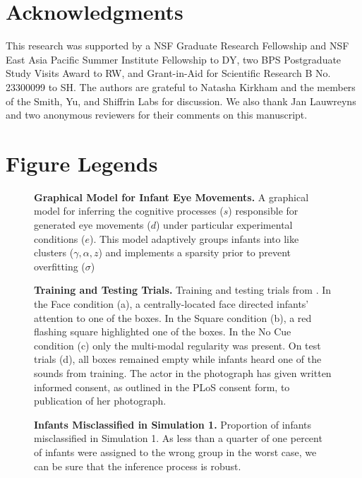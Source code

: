 \documentclass[12pt]{article}
\begin{document}
\section*{Acknowledgments}

This research was supported by a NSF Graduate Research Fellowship and NSF East Asia Pacific Summer Institute Fellowship to DY, two BPS Postgraduate Study Visits Award to RW, and Grant-in-Aid for Scientific Research B No. 23300099 to SH. The authors are grateful to Natasha Kirkham and the members of the Smith, Yu, and Shiffrin Labs for discussion. We also thank Jan Lauwreyns and two anonymous reviewers for their comments on this manuscript.

\clearpage


\section*{Figure Legends}

\begin{figure}[!h]
\caption{\textbf{Graphical Model for Infant Eye Movements.} A graphical model for inferring the cognitive processes ($s$) responsible for generated eye movements ($d$) under particular experimental conditions ($e$). This model adaptively groups infants into like clusters ($\gamma, \alpha, z$) and implements a sparsity prior to prevent overfitting ($\sigma$)}
\label{fig:plates}
\end{figure}

\begin{figure}[!h]
\caption{\textbf{Training and Testing Trials.} Training and testing trials from \cite{Wu2010a}. In the Face condition (a), a centrally-located face directed infants' attention to one of the boxes. In the Square condition (b), a red flashing square highlighted one of the boxes. In the No Cue condition (c) only the multi-modal regularity was present. On test trials (d), all boxes remained empty while infants heard one of the sounds from training. The actor in the photograph has given written informed consent, as outlined in the PLoS consent form, to publication of her photograph.}
\label{fig:conds}
\end{figure}

\begin{figure}[!h]
\caption{\textbf{Infants Misclassified in Simulation 1.} Proportion of infants misclassified in Simulation 1. As less than a quarter of one percent of infants were assigned to the wrong group in the worst case, we can be sure that the inference process is robust.}
\label{fig:sim1}
\end{figure}
\end{document}
